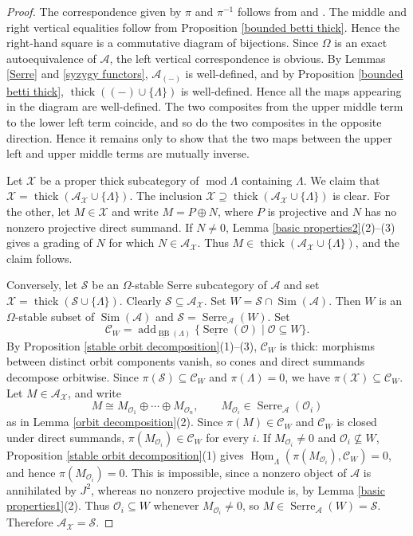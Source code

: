 \documentclass{amsart}
\theoremstyle{definition}
\theoremstyle{remark}
\numberwithin{equation}{thm}
\def\A{\mathcal{A}}
\def\add{\operatorname{add}}
\def\BB{\operatorname{BB}}
\def\Hom{\operatorname{Hom}}
\def\L{\Lambda}
\def\mod{\operatorname{mod}}
\def\O{\mathcal{O}}
\def\Serre{\operatorname{Serre}}
\def\thick{\operatorname{thick}}
\def\X{\mathcal{X}}
\begin{document}
\begin{proof}
The correspondence given by $\pi$ and $\pi^{-1}$ follows from \cite[Theorem 1 and Remark 2]{KS} and \cite[Theorem 2.1]{R}. The middle and right vertical equalities follow from Proposition \ref{bounded betti thick}.
Hence the right-hand square is a commutative diagram of bijections.
Since $\Omega$ is an exact autoequivalence of $\A$, the left vertical correspondence is obvious.
By Lemmas \ref{Serre} and \ref{syzygy functors}, $\A_{(-)}$ is well-defined, and by Proposition \ref{bounded betti thick},  $\thick((-)\cup\{\L\})$ is well-defined. Hence all the maps appearing in the diagram are well-defined.
The two composites from the upper middle term to the lower left term coincide, and so do the two composites in the opposite direction. Hence it remains only to show that the two maps between the upper left and upper middle terms are mutually inverse.

Let $\X$ be a proper thick subcategory of $\mod\L$ containing $\L$.
We claim that $\X=\thick(\A_\X\cup\{\L\})$.
The inclusion $\X\supseteq\thick(\A_\X\cup\{\L\})$ is clear.
For the other, let $M\in\X$ and write $M=P\oplus N$, where $P$ is projective and $N$ has no nonzero projective direct summand.
If $N\ne0$, Lemma \ref{basic properties2}(2)--(3) gives a grading of $N$ for which $N\in\A_\X$.
Thus $M\in\thick(\A_\X\cup\{\L\})$, and the claim follows.

Conversely, let $\mathcal{S}$ be an $\Omega$-stable Serre subcategory of $\A$ and set $\X=\thick(\mathcal{S}\cup\{\L\})$.
Clearly $\mathcal{S}\subseteq\A_\X$.
Set $W=\mathcal{S}\cap\operatorname{Sim}(\A)$.
Then $W$ is an $\Omega$-stable subset of $\operatorname{Sim}(\A)$ and $\mathcal{S}=\Serre_{\A} (W)$.
Set
$$
\mathcal{C}_W=\add_{\underline{\BB}(\L)}\{\underline{\Serre}(\O)\mid \O\subseteq W\}.
$$
By Proposition \ref{stable orbit decomposition}(1)--(3), $\mathcal{C}_W$ is thick: morphisms between distinct orbit components vanish, so cones and direct summands decompose orbitwise.
Since $\pi(\mathcal{S})\subseteq\mathcal{C}_W$ and $\pi(\L)=0$, we have
$\pi(\X)\subseteq\mathcal{C}_W$.
Let $M\in\A_\X$, and write
$$
M\cong M_{\O_1}\oplus\cdots\oplus M_{\O_n},
\qquad
M_{\O_i}\in\Serre_{\A}(\O_i)
$$
as in Lemma \ref{orbit decomposition}(2).
Since $\pi(M)\in\mathcal{C}_W$ and $\mathcal{C}_W$ is closed under direct
summands, $\pi(M_{\O_i})\in\mathcal{C}_W$ for every $i$.
If $M_{\O_i}\ne0$ and $\O_i\not\subseteq W$, Proposition
\ref{stable orbit decomposition}(1) gives $\underline{\Hom}_\L(\pi(M_{\O_i}),\mathcal{C}_W)=0$, and hence $\pi(M_{\O_i})=0$.
This is impossible, since a nonzero object of $\A$ is annihilated by
$J^2$, whereas no nonzero projective module is, by Lemma
\ref{basic properties1}(2).
Thus $\O_i\subseteq W$ whenever $M_{\O_i}\ne0$, so
$M\in\Serre_{\A}(W)=\mathcal{S}$.
Therefore $\A_\X=\mathcal{S}$.
\end{proof}
\end{document}
